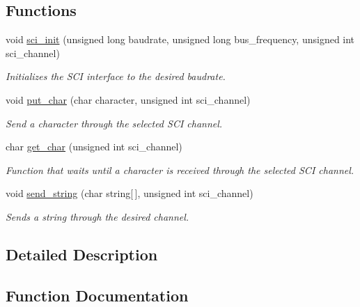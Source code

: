\subsection*{Functions}
\begin{DoxyCompactItemize}
\item 
void \hyperlink{group___s_c_i_ga5064f416c84236092cef3147fe0036c1}{sci\+\_\+init} (unsigned long baudrate, unsigned long bus\+\_\+frequency, unsigned int sci\+\_\+channel)
\begin{DoxyCompactList}\small\item\em Initializes the S\+C\+I interface to the desired baudrate. \end{DoxyCompactList}\item 
void \hyperlink{group___s_c_i_ga487c3bdee8a71648e5133e7104f2bddf}{put\+\_\+char} (char character, unsigned int sci\+\_\+channel)
\begin{DoxyCompactList}\small\item\em Send a character through the selected S\+C\+I channel. \end{DoxyCompactList}\item 
char \hyperlink{group___s_c_i_ga0b72a0d9b0c7a786c00aec3b91cf0e30}{get\+\_\+char} (unsigned int sci\+\_\+channel)
\begin{DoxyCompactList}\small\item\em Function that waits until a character is received through the selected S\+C\+I channel. \end{DoxyCompactList}\item 
void \hyperlink{group___s_c_i_ga9df467e6c221f71bbc6080694cc5c67c}{send\+\_\+string} (char string\mbox{[}$\,$\mbox{]}, unsigned int sci\+\_\+channel)
\begin{DoxyCompactList}\small\item\em Sends a string through the desired channel. \end{DoxyCompactList}\end{DoxyCompactItemize}


\subsection{Detailed Description}


\subsection{Function Documentation}
\hypertarget{group___s_c_i_ga0b72a0d9b0c7a786c00aec3b91cf0e30}{}
